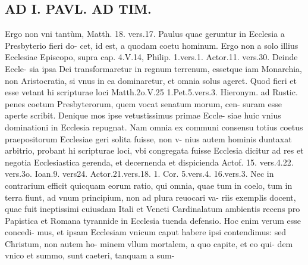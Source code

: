 \documentclass{article}
\begin{document}
\begin{pages}
\section*{AD I. PAVL. AD TIM. }
\marginpar{[ p.242 ]}\pstart Ergo non vni tantùm, Matth. 18. vers.17. Paulus quae geruntur in Ecclesia a Presbyterio fieri do- cet, id est, a quodam coetu hominum. Ergo non a solo illius Ecclesiae Episcopo, supra cap. 4.V.14, Philip. 1.vers.1. Actor.11. vers.30. Deinde Eccle- sia ipsa Dei transformaretur in regnum terrenum, essetque iam Monarchia, non Aristocratia, si vnus in ea dominaretur, et omnia solus ageret. Quod fieri et esse vetant hi scripturae loci Matth.2o.V.25 1.Pet.5.vers.3. Hieronym. ad Rustic. penes coetum Presbyterorum, quem vocat senatum morum, cen- suram esse aperte scribit.  \pend\pstart Denique mos ipse vetustissimus primae Eccle- siae huic vnius dominationi in Ecclesia repugnat. Nam omnia ex communi consensu totius coetus praepositorum Ecclesiae geri solita fuisse, non v- nius autem hominis duntaxat arbitrio, probant hi scripturae loci, vbi congregata fuisse Ecclesia dicitur ad res et negotia Ecclesiastica gerenda, et decernenda et dispicienda Actof. 15. vers.4.22. vers.3o. Ioan.9. vers24. Actor.21.vers.18. 1. Cor. 5.vers.4. 16.vers.3.  \pend\pstart Nec in contrarium efficit quicquam eorum ratio, qui omnia, quae tum in coelo, tum in terra fiunt, ad vnum principium, non ad plura reuocari va- riis exemplis docent, quae fuit ineptissimi cuiusdam Itali et Veneti Cardinalatum ambientis recens pro Papistica et Romana tyrannide in Ecclesia tuenda defensio. Hoc enim verum esse concedi- mus, et ipsam Ecclesiam vnicum caput habere ipsi contendimus: sed Christum, non autem ho- minem vllum mortalem, a quo capite, et eo qui- dem vnico et summo, sunt caeteri, tanquam a sum-  \pend

\end{pages}
\end{document}
